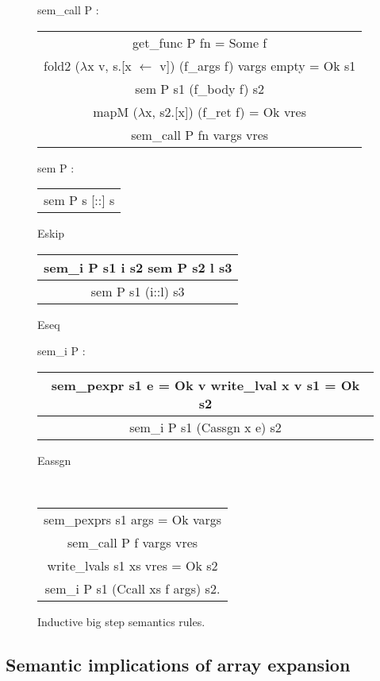 \documentclass{article}
\begin{document}
\begin{figure}
\ttfamily
sem\_call P :
\begin{center}
\begin{tabular}{c}
get\_func P fn = Some f \\
fold2 (\(\lambda\)x v, s.[x \(\leftarrow\) v]) (f\_args f) vargs empty = Ok s1 \\
sem P s1 (f\_body f) s2 \\
mapM (\(\lambda\)x, s2.[x]) (f\_ret f) = Ok vres
\\\hline
sem\_call P fn vargs vres
\end{tabular}
\end{center}

sem P :
\begin{center}
\begin{tabular}{c}
\\\hline
sem P s [::] s
\end{tabular} Eskip\quad
\begin{tabular}{c}
sem\_i P s1 i s2\quad
sem P s2 l s3
\\\hline
sem P s1 (i::l) s3
\end{tabular} Eseq
\end{center}

sem\_i P :
\begin{center}
\begin{tabular}{c}
sem\_pexpr s1 e = Ok v\quad
write\_lval x v s1 = Ok s2
\\\hline
sem\_i P s1 (Cassgn x e) s2
\end{tabular} Eassgn

~

\begin{tabular}{c}
sem\_pexprs s1 args = Ok vargs \\
sem\_call P f vargs vres \\
write\_lvals s1 xs vres = Ok s2
\\\hline
sem\_i P s1 (Ccall xs f args) s2.
\end{tabular} \raisebox{-\baselineskip}{Ecall}
\end{center}
\normalfont%
\caption{Inductive big step semantics rules.}
\end{figure}



\subsection{Semantic implications of array expansion}
\end{document}
